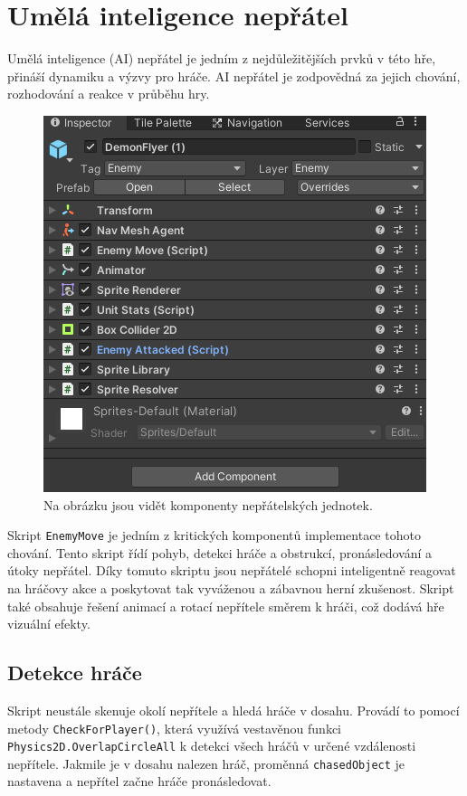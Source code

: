 \section{Umělá inteligence nepřátel}
Umělá inteligence (AI) nepřátel je jedním z nejdůležitějších prvků v této hře, přináší dynamiku a výzvy pro hráče. AI nepřátel je zodpovědná za jejich chování, rozhodování a reakce v průběhu hry. 

\begin{figure}[H]
	\centering
	\includegraphics[scale=1]{obrazky-figures/EnemyComponents.png}
	\caption{Na obrázku jsou vidět komponenty nepřátelských jednotek.}
	\label{EnemyScripts}
\end{figure}

Skript \texttt{EnemyMove} je jedním z kritických komponentů implementace tohoto chování. Tento skript řídí pohyb, detekci hráče a obstrukcí, pronásledování a útoky nepřátel. Díky tomuto skriptu jsou nepřátelé schopni inteligentně reagovat na hráčovy akce a poskytovat tak vyváženou a zábavnou herní zkušenost. Skript také obsahuje řešení animací a rotací nepřítele směrem k hráči, což dodává hře vizuální efekty.

\subsection{Detekce hráče}
Skript neustále skenuje okolí nepřítele a hledá hráče v dosahu. Provádí to pomocí metody \texttt{CheckForPlayer()}, která využívá vestavěnou funkci \texttt{Physics2D.OverlapCircleAll} k detekci všech hráčů v určené vzdálenosti nepřítele. Jakmile je v dosahu nalezen hráč, proměnná \texttt{chasedObject} je nastavena a nepřítel začne hráče pronásledovat.

